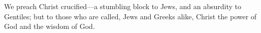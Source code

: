\lettrine[lines=3]{W}{}e preach Christ crucified—a stumbling block to Jews, and an absurdity to Gentiles; but to those who are called, Jews and Greeks alike, Christ the power of God and the wisdom of God.
